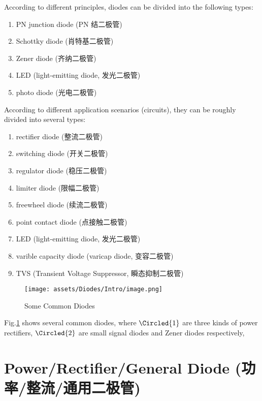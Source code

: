 \documentclass[UTF8]{report}
\begin{document}
\begin{center}
\noindent\begin{minipage}{0.55\columnwidth}
    According to different principles, diodes can be divided into the following types:
    \begin{enumerate}
    \item PN junction diode (PN 结二极管)
    \item Schottky diode (肖特基二极管)
    \item Zener diode (齐纳二极管)
    \item LED (light-emitting diode, 发光二极管)
    \item photo diode (光电二极管)
    \end{enumerate}
    According to different application scenarios (circuits), they can be roughly divided into several types:
    \begin{enumerate}
    \item rectifier diode (整流二极管)
    \item switching diode (开关二极管)
    \item regulator diode (稳压二极管)
    \item limiter diode (限幅二极管)
    \item freewheel diode (续流二极管)
    \item point contact diode (点接触二极管)
    \item LED (light-emitting diode, 发光二极管)
    \item varible capacity diode (varicap diode, 变容二极管)
    \item TVS (Transient Voltage Suppressor, 瞬态抑制二极管)
    \end{enumerate}
\end{minipage}\hfill\begin{minipage}{0.42\columnwidth}
\begin{figure}[H]\centering
    \texttt{[image: assets/Diodes/Intro/image.png]}
    \caption{Some Common Diodes}
    \label{Some Common Diodes}
\end{figure}
\end{minipage}\end{center}
Fig.\ref{Some Common Diodes} shows several common diodes, where $\Circled{1}$ are three kinds of power rectifiers, $\Circled{2}$ are small signal diodes and Zener diodes respectively, 

\section{Power/Rectifier/General Diode (功率/整流/通用二极管)}
\end{document}
